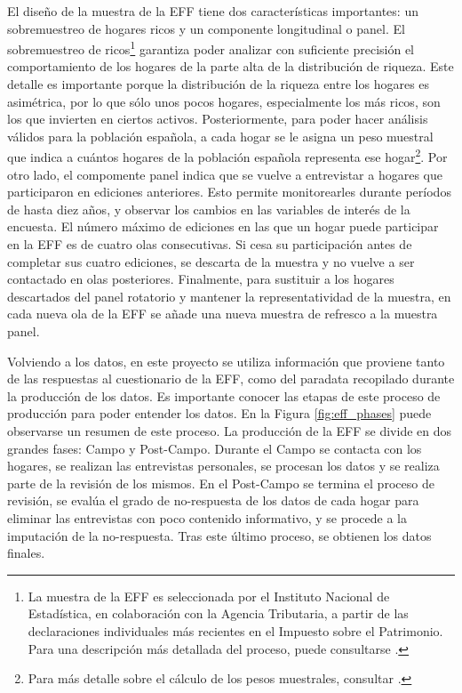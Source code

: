 El diseño de la muestra de la EFF tiene dos características importantes: un sobremuestreo de hogares ricos y un componente longitudinal o panel. El sobremuestreo de ricos\footnote{La muestra de la EFF es seleccionada por el Instituto Nacional de Estadística, en colaboración con la Agencia Tributaria, a partir de las declaraciones individuales más recientes en el Impuesto sobre el Patrimonio. Para una descripción más detallada del proceso, puede consultarse \cite{effmethod2017}.} garantiza poder analizar con suficiente precisión el comportamiento de los hogares de la parte alta de la distribución de riqueza. Este detalle es importante porque la distribución de la riqueza entre los hogares es asimétrica, por lo que sólo unos pocos hogares, especialmente los más ricos, son los que invierten en ciertos activos. Posteriormente, para poder hacer análisis válidos para la población española, a cada hogar se le asigna un peso muestral que indica a cuántos hogares de la población española representa ese hogar\footnote{Para más detalle sobre el cálculo de los pesos muestrales, consultar \cite{effmethod2002}.}. Por otro lado, el compomente panel indica que se vuelve a entrevistar a hogares que participaron en ediciones anteriores. Esto permite monitorearles durante períodos de hasta diez años, y observar los cambios en las variables de interés de la encuesta. El número máximo de ediciones en las que un hogar puede participar en la EFF es de cuatro olas consecutivas. Si cesa su participación antes de completar sus cuatro ediciones, se descarta de la muestra y no vuelve a ser contactado en olas posteriores. Finalmente, para sustituir a los hogares descartados del panel rotatorio y mantener la representatividad de la muestra, en cada nueva ola de la EFF se añade una nueva muestra de refresco a la muestra panel.

Volviendo a los datos, en este proyecto se utiliza información que proviene tanto de las respuestas al cuestionario de la EFF, como del paradata recopilado durante la producción de los datos. Es importante conocer las etapas de este proceso de producción para poder entender los datos. En la Figura \ref{fig:eff_phases} puede observarse un resumen de este proceso. La producción de la EFF se divide en dos grandes fases: Campo y Post-Campo. Durante el Campo se contacta con los hogares, se realizan las entrevistas personales, se procesan los datos y se realiza parte de la revisión de los mismos. En el Post-Campo se termina el proceso de revisión, se evalúa el grado de no-respuesta de los datos de cada hogar para eliminar las entrevistas con poco contenido informativo, y se procede a la imputación de la no-respuesta. Tras este último proceso, se obtienen los datos finales.


